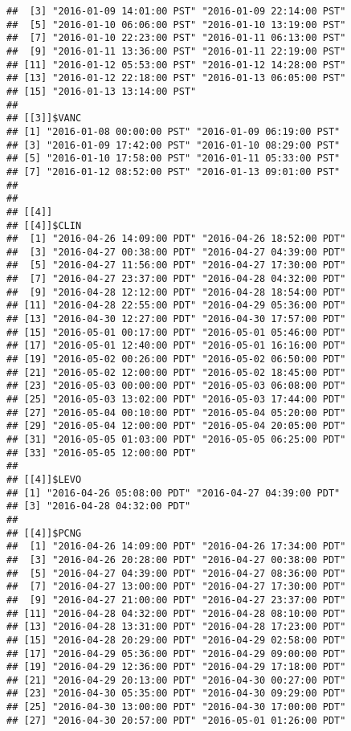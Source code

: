 \documentclass[]{article}
\begin{document}
\begin{verbatim}
##  [3] "2016-01-09 14:01:00 PST" "2016-01-09 22:14:00 PST"
##  [5] "2016-01-10 06:06:00 PST" "2016-01-10 13:19:00 PST"
##  [7] "2016-01-10 22:23:00 PST" "2016-01-11 06:13:00 PST"
##  [9] "2016-01-11 13:36:00 PST" "2016-01-11 22:19:00 PST"
## [11] "2016-01-12 05:53:00 PST" "2016-01-12 14:28:00 PST"
## [13] "2016-01-12 22:18:00 PST" "2016-01-13 06:05:00 PST"
## [15] "2016-01-13 13:14:00 PST"
## 
## [[3]]$VANC
## [1] "2016-01-08 00:00:00 PST" "2016-01-09 06:19:00 PST"
## [3] "2016-01-09 17:42:00 PST" "2016-01-10 08:29:00 PST"
## [5] "2016-01-10 17:58:00 PST" "2016-01-11 05:33:00 PST"
## [7] "2016-01-12 08:52:00 PST" "2016-01-13 09:01:00 PST"
## 
## 
## [[4]]
## [[4]]$CLIN
##  [1] "2016-04-26 14:09:00 PDT" "2016-04-26 18:52:00 PDT"
##  [3] "2016-04-27 00:38:00 PDT" "2016-04-27 04:39:00 PDT"
##  [5] "2016-04-27 11:56:00 PDT" "2016-04-27 17:30:00 PDT"
##  [7] "2016-04-27 23:37:00 PDT" "2016-04-28 04:32:00 PDT"
##  [9] "2016-04-28 12:12:00 PDT" "2016-04-28 18:54:00 PDT"
## [11] "2016-04-28 22:55:00 PDT" "2016-04-29 05:36:00 PDT"
## [13] "2016-04-30 12:27:00 PDT" "2016-04-30 17:57:00 PDT"
## [15] "2016-05-01 00:17:00 PDT" "2016-05-01 05:46:00 PDT"
## [17] "2016-05-01 12:40:00 PDT" "2016-05-01 16:16:00 PDT"
## [19] "2016-05-02 00:26:00 PDT" "2016-05-02 06:50:00 PDT"
## [21] "2016-05-02 12:00:00 PDT" "2016-05-02 18:45:00 PDT"
## [23] "2016-05-03 00:00:00 PDT" "2016-05-03 06:08:00 PDT"
## [25] "2016-05-03 13:02:00 PDT" "2016-05-03 17:44:00 PDT"
## [27] "2016-05-04 00:10:00 PDT" "2016-05-04 05:20:00 PDT"
## [29] "2016-05-04 12:00:00 PDT" "2016-05-04 20:05:00 PDT"
## [31] "2016-05-05 01:03:00 PDT" "2016-05-05 06:25:00 PDT"
## [33] "2016-05-05 12:00:00 PDT"
## 
## [[4]]$LEVO
## [1] "2016-04-26 05:08:00 PDT" "2016-04-27 04:39:00 PDT"
## [3] "2016-04-28 04:32:00 PDT"
## 
## [[4]]$PCNG
##  [1] "2016-04-26 14:09:00 PDT" "2016-04-26 17:34:00 PDT"
##  [3] "2016-04-26 20:28:00 PDT" "2016-04-27 00:38:00 PDT"
##  [5] "2016-04-27 04:39:00 PDT" "2016-04-27 08:36:00 PDT"
##  [7] "2016-04-27 13:00:00 PDT" "2016-04-27 17:30:00 PDT"
##  [9] "2016-04-27 21:00:00 PDT" "2016-04-27 23:37:00 PDT"
## [11] "2016-04-28 04:32:00 PDT" "2016-04-28 08:10:00 PDT"
## [13] "2016-04-28 13:31:00 PDT" "2016-04-28 17:23:00 PDT"
## [15] "2016-04-28 20:29:00 PDT" "2016-04-29 02:58:00 PDT"
## [17] "2016-04-29 05:36:00 PDT" "2016-04-29 09:00:00 PDT"
## [19] "2016-04-29 12:36:00 PDT" "2016-04-29 17:18:00 PDT"
## [21] "2016-04-29 20:13:00 PDT" "2016-04-30 00:27:00 PDT"
## [23] "2016-04-30 05:35:00 PDT" "2016-04-30 09:29:00 PDT"
## [25] "2016-04-30 13:00:00 PDT" "2016-04-30 17:00:00 PDT"
## [27] "2016-04-30 20:57:00 PDT" "2016-05-01 01:26:00 PDT"

\end{verbatim}
\end{document}

